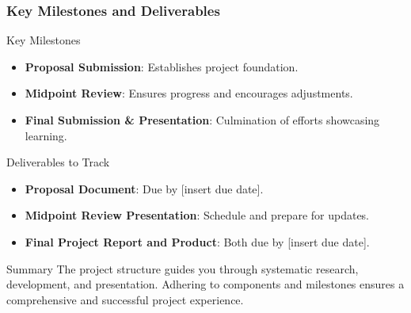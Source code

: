 \documentclass[aspectratio=169]{beamer}
\begin{document}
\begin{frame}[fragile]
    \frametitle{Key Milestones and Deliverables}
    \begin{block}{Key Milestones}
        \begin{itemize}
            \item \textbf{Proposal Submission}: Establishes project foundation.
            \item \textbf{Midpoint Review}: Ensures progress and encourages adjustments.
            \item \textbf{Final Submission \& Presentation}: Culmination of efforts showcasing learning.
        \end{itemize}
    \end{block}
    
    \begin{block}{Deliverables to Track}
        \begin{itemize}
            \item \textbf{Proposal Document}: Due by [insert due date].
            \item \textbf{Midpoint Review Presentation}: Schedule and prepare for updates.
            \item \textbf{Final Project Report and Product}: Both due by [insert due date].
        \end{itemize}
    \end{block}
    
    \begin{block}{Summary}
        The project structure guides you through systematic research, development, and presentation. Adhering to components and milestones ensures a comprehensive and successful project experience.
    \end{block}
\end{frame}
\end{document}
